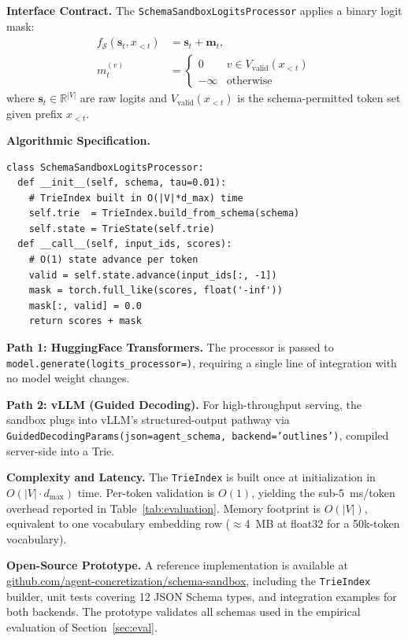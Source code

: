 \documentclass[10pt,journal,compsoc]{IEEEtran}
\begin{document}
\textbf{Interface Contract.} The \texttt{SchemaSandboxLogitsProcessor} applies a binary logit mask:
\begin{equation}
\begin{split}
  f_\mathcal{S}(\mathbf{s}_t, x_{<t}) &= \mathbf{s}_t + \mathbf{m}_t, \\
  m_t^{(v)} &= \begin{cases} 0 & v \in V_{\text{valid}}(x_{<t}) \\ -\infty & \text{otherwise} \end{cases}
\end{split}
\label{eq:logit_mask}
\end{equation}
where $\mathbf{s}_t \in \mathbb{R}^{|V|}$ are raw logits and $V_{\text{valid}}(x_{<t})$ is the schema-permitted token set given prefix $x_{<t}$.

\textbf{Algorithmic Specification.}\par\smallskip
\noindent
{\footnotesize
\begin{verbatim}
class SchemaSandboxLogitsProcessor:
  def __init__(self, schema, tau=0.01):
    # TrieIndex built in O(|V|*d_max) time
    self.trie  = TrieIndex.build_from_schema(schema)
    self.state = TrieState(self.trie)
  def __call__(self, input_ids, scores):
    # O(1) state advance per token
    valid = self.state.advance(input_ids[:, -1])
    mask = torch.full_like(scores, float('-inf'))
    mask[:, valid] = 0.0
    return scores + mask
\end{verbatim}
\par}

\textbf{Path 1: HuggingFace Transformers.} The processor is passed to \texttt{model.generate(\allowbreak logits\_processor=\allowbreak [processor])}, requiring a single line of integration with no model weight changes.

\textbf{Path 2: vLLM (Guided Decoding).} For high-throughput serving, the sandbox plugs into vLLM's structured-output pathway via \texttt{GuidedDecodingParams(\allowbreak json=agent\_schema, \allowbreak backend='outlines')}, compiled server-side into a Trie.

\textbf{Complexity and Latency.} The \texttt{TrieIndex} is built once at initialization in $O(|V| \cdot d_{\max})$ time. Per-token validation is $O(1)$, yielding the sub-5~ms/token overhead reported in Table~\ref{tab:evaluation}. Memory footprint is $O(|V|)$, equivalent to one vocabulary embedding row ($\approx$4~MB at float32 for a 50k-token vocabulary).

\textbf{Open-Source Prototype.} A reference implementation is available at \url{github.com/agent-concretization/schema-sandbox}, including the \texttt{TrieIndex} builder, unit tests covering 12 JSON Schema types, and integration examples for both backends. The prototype validates all schemas used in the empirical evaluation of Section~\ref{sec:eval}.
\end{document}
